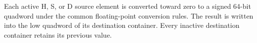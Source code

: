 Each active H, S, or D source element is converted toward zero to a signed
64-bit quadword under the common floating-point conversion rules. The result
is written into the low quadword of its destination container. Every inactive
destination container retains its previous value.
